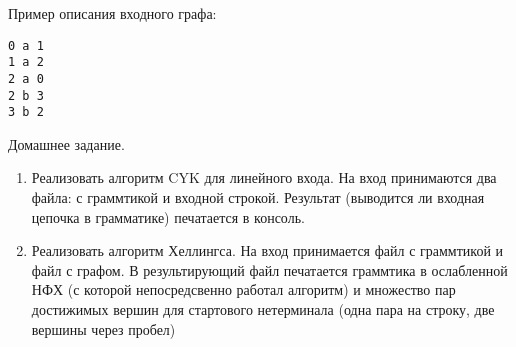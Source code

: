 Пример описания входного графа:
\begin{verbatim}
0 a 1
1 a 2 
2 a 0
2 b 3
3 b 2
\end{verbatim}

Домашнее задание.
\begin{enumerate}
    \item Реализовать алгоритм CYK для линейного входа. На вход принимаются два файла: с граммтикой и входной строкой. Результат (выводится ли входная цепочка в грамматике) печатается в консоль.
    \item Реализовать алгоритм Хеллингса. На вход принимается файл с граммтикой и файл с графом. В результирующий файл печатается граммтика в ослабленной НФХ (с которой непосредсвенно работал алгоритм) и множество пар достижимых вершин для стартового нетерминала (одна пара на строку, две вершины через пробел)  
\end{enumerate} 
